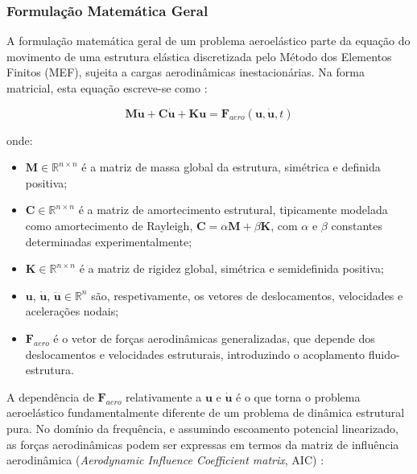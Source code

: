 \documentclass[a4paper,fleqn,noprintline]{cas-dc}
\begin{document}
\subsubsection{Formulação Matemática Geral}

A formulação matemática geral de um problema aeroelástico parte da equação do movimento de uma estrutura elástica discretizada pelo Método dos Elementos Finitos (MEF), sujeita a cargas aerodinâmicas inestacionárias. Na forma matricial, esta equação escreve-se como \cite{Hodges2011, Nastran2014}:

\begin{equation}
    \mathbf{M}\ddot{\mathbf{u}} + \mathbf{C}\dot{\mathbf{u}} + 
    \mathbf{K}\mathbf{u} = \mathbf{F}_{aero}(\mathbf{u}, 
    \dot{\mathbf{u}}, t)
    \label{eq:eom_geral}
\end{equation}

\noindent onde:
\begin{itemize}
    \item $\mathbf{M} \in \mathbb{R}^{n \times n}$ é a matriz de massa global da estrutura, simétrica e definida positiva;
    \item $\mathbf{C} \in \mathbb{R}^{n \times n}$ é a matriz de amortecimento estrutural, tipicamente modelada como amortecimento de Rayleigh, $\mathbf{C} = \alpha \mathbf{M} + \beta \mathbf{K}$, com $\alpha$ e $\beta$ constantes determinadas experimentalmente;
    \item $\mathbf{K} \in \mathbb{R}^{n \times n}$ é a matriz de rigidez global, simétrica e semidefinida positiva;
    \item $\mathbf{u}$, $\dot{\mathbf{u}}$, $\ddot{\mathbf{u}} \in 
    \mathbb{R}^{n}$ são, respetivamente, os vetores de deslocamentos, velocidades e acelerações nodais;
    \item $\mathbf{F}_{aero}$ é o vetor de forças aerodinâmicas generalizadas, que depende dos deslocamentos e velocidades estruturais, introduzindo o acoplamento fluido-estrutura.
\end{itemize}

A dependência de $\mathbf{F}_{aero}$ relativamente a $\mathbf{u}$ e $\dot{\mathbf{u}}$ é o que torna o problema aeroelástico fundamentalmente diferente de um problema de dinâmica estrutural pura. No domínio da frequência, e assumindo escoamento potencial linearizado, as forças aerodinâmicas podem ser expressas em termos da matriz de influência aerodinâmica (\textit{Aerodynamic Influence Coefficient matrix}, AIC) \cite{Roger1977}:
\end{document}
